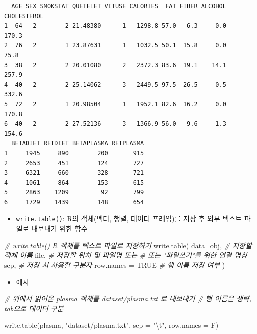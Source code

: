 \documentclass[
  11pt,
]{krantz}
\newenvironment{Shaded}{\begin{snugshade}}{\end{snugshade}}
\newcommand{\AttributeTok}[1]{\textcolor[rgb]{0.61,0.61,0.61}{#1}}
\newcommand{\CommentTok}[1]{\textcolor[rgb]{0.37,0.37,0.37}{\textit{#1}}}
\newcommand{\ConstantTok}[1]{\textcolor[rgb]{0,0,0}{#1}}
\newcommand{\FunctionTok}[1]{\textcolor[rgb]{0,0,0}{#1}}
\newcommand{\NormalTok}[1]{#1}
\newcommand{\SpecialCharTok}[1]{\textcolor[rgb]{0,0,0}{#1}}
\newcommand{\StringTok}[1]{\textcolor[rgb]{0.5,0.5,0.5}{#1}}
\providecommand{\tightlist}{%
  \setlength{\itemsep}{0pt}\setlength{\parskip}{0pt}}
\begin{document}
\begin{verbatim}
  AGE SEX SMOKSTAT QUETELET VITUSE CALORIES  FAT FIBER ALCOHOL CHOLESTEROL
1  64   2        2 21.48380      1   1298.8 57.0   6.3     0.0       170.3
2  76   2        1 23.87631      1   1032.5 50.1  15.8     0.0        75.8
3  38   2        2 20.01080      2   2372.3 83.6  19.1    14.1       257.9
4  40   2        2 25.14062      3   2449.5 97.5  26.5     0.5       332.6
5  72   2        1 20.98504      1   1952.1 82.6  16.2     0.0       170.8
6  40   2        2 27.52136      3   1366.9 56.0   9.6     1.3       154.6
  BETADIET RETDIET BETAPLASMA RETPLASMA
1     1945     890        200       915
2     2653     451        124       727
3     6321     660        328       721
4     1061     864        153       615
5     2863    1209         92       799
6     1729    1439        148       654
\end{verbatim}

\normalsize

\begin{itemize}
\tightlist
\item
  \texttt{write.table()}: R의 객체(벡터, 행렬, 데이터 프레임)를 저장 후 외부 텍스트 파일로 내보내기 위한 함수
\end{itemize}

\footnotesize

\begin{Shaded}
\begin{Highlighting}[]
\CommentTok{\# write.table() R 객체를 텍스트 파일로 저장하기}
\FunctionTok{write.table}\NormalTok{(}
\NormalTok{  data\_obj, }\CommentTok{\# 저장할 객체 이름}
\NormalTok{  file,  }\CommentTok{\# 저장할 위치 및 파일명  또는 }
         \CommentTok{\# 또는 "파일쓰기"를 위한 연결 명칭}
\NormalTok{  sep,   }\CommentTok{\# 저장 시 사용할 구분자}
  \AttributeTok{row.names =} \ConstantTok{TRUE} \CommentTok{\# 행 이름 저장 여부}
\NormalTok{)}
\end{Highlighting}
\end{Shaded}

\normalsize

\begin{itemize}
\tightlist
\item
  예시
\end{itemize}

\footnotesize

\begin{Shaded}
\begin{Highlighting}[]
\CommentTok{\# 위에서 읽어온 plasma 객체를 dataset/plasma.txt 로 내보내기}
\CommentTok{\# 행 이름은 생략, tab으로 데이터 구분}

\FunctionTok{write.table}\NormalTok{(plasma, }\StringTok{"dataset/plasma.txt"}\NormalTok{, }
            \AttributeTok{sep =} \StringTok{"}\SpecialCharTok{\textbackslash{}t}\StringTok{"}\NormalTok{, }\AttributeTok{row.names =}\NormalTok{ F)}
\end{Highlighting}
\end{Shaded}
\end{document}
